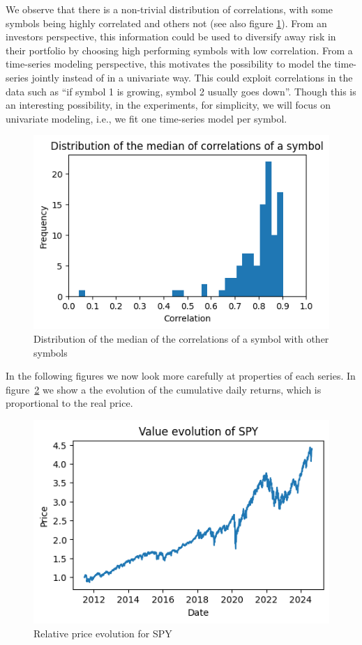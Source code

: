 \documentclass[10pt]{article}
\begin{document}
We observe that there is a non-trivial distribution of correlations,
with some symbols being highly correlated and others not (see also
figure {\ref{548098}}). From an investors perspective,
this information could be used to diversify away risk in their portfolio
by choosing high performing symbols with low correlation. From a
time-series modeling perspective, this motivates the possibility to
model the time-series jointly instead of in a univariate way. This could
exploit correlations in the data such as ``if symbol 1 is growing,
symbol 2 usually goes down''. Though this is an interesting possibility,
in the experiments, for simplicity, we will focus on univariate
modeling, i.e., we fit one time-series model per symbol.
\begin{figure}[H]
\begin{center}
\includegraphics[width=0.70\columnwidth]{figures/output4/output4}
\caption{{Distribution of the median of the correlations of a symbol with other
symbols
{\label{548098}}%
}}
\end{center}
\end{figure}

In the following figures we now look more carefully at properties of
each series. In figure~{\ref{273127}} we show a the
evolution of the cumulative daily returns, which is proportional to the
real price.
\begin{figure}[H]
\begin{center}
\includegraphics[width=0.70\columnwidth]{figures/output3/output3}
\caption{{Relative price evolution for SPY
{\label{273127}}%
}}
\end{center}
\end{figure}
\end{document}

